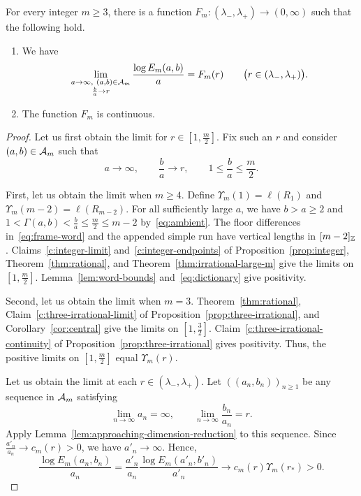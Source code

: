 \begin{proposition}\label{prop:interior-limit}
For every integer $m\ge3$, there is a function
$F_m:(\lambda_-,\lambda_+)\to(0,\infty)$ such that the following hold.
\begin{enumerate}
\item\label{c:interior-limit} We have
\[
 \lim_{\substack{a\to\infty,\ (a,b)\in\cA_m\\\frac{b}{a}\to r}}
 \frac{\log E_m(a,b)}a=F_m(r)
 \qquad\bigl(r\in(\lambda_-,\lambda_+)\bigr).
\]
\item\label{c:interior-continuity} The function $F_m$ is continuous.
\end{enumerate}
\end{proposition}
\begin{proof}
 Let us first obtain the limit for $r\in[1,\frac m2]$.
Fix such an $r$ and consider $(a,b)\in\mathcal A_m$ such that
\[
 a\longrightarrow\infty,\qquad \frac ba\longrightarrow r,\qquad
 1\le\frac ba\le\frac m2.
\]

First, let us obtain the limit when $m\ge4$.
Define $\Upsilon_m(1)=\ell(R_1)$ and $\Upsilon_m(m-2)=\ell(R_{m-2})$.
For all sufficiently large $a$, we have $b>a\ge2$ and
$1<\Gamma(a,b)<\frac ba\le \frac{m}{2}\le m-2$ by~\eqref{eq:ambient}.
The floor differences in~\eqref{eq:frame-word} and the appended simple run have vertical lengths in $[m-2]_{\mathbb Z}$.
Claims~\ref{c:integer-limit} and~\ref{c:integer-endpoints} of Proposition~\ref{prop:integer},
Theorem~\ref{thm:rational}, and Theorem~\ref{thm:irrational-large-m} give the limits on $[1,\frac{m}{2}]$.
Lemma~\ref{lem:word-bounds} and~\eqref{eq:dictionary} give positivity.

Second, let us obtain the limit when $m=3$.
Theorem~\ref{thm:rational}, Claim~\ref{c:three-irrational-limit} of
Proposition~\ref{prop:three-irrational}, and Corollary~\ref{cor:central} give the limits on $[1,\frac32]$.
Claim~\ref{c:three-irrational-continuity} of Proposition~\ref{prop:three-irrational} gives positivity.
Thus, the positive limits on $[1,\frac m2]$ equal $\Upsilon_m(r)$.

Let us obtain the limit at each $r\in(\lambda_-,\lambda_+)$.
Let $((a_n,b_n))_{n\ge1}$ be any sequence in $\mathcal A_m$ satisfying
\[
 \lim_{n\to\infty}a_n=\infty,\qquad
 \lim_{n\to\infty}\frac{b_n}{a_n}=r.
\]
Apply Lemma~\ref{lem:approaching-dimension-reduction} to this sequence.
Since $\frac{a'_n}{a_n}\to c_m(r)>0$, we have $a'_n\to\infty$.
Hence,
\[
 \frac{\log E_m(a_n,b_n)}{a_n}
 =\frac{a'_n}{a_n}\frac{\log E_m(a'_n,b'_n)}{a'_n}
 \longrightarrow c_m(r)\Upsilon_m(r_*)>0.
\]


\end{proof}
